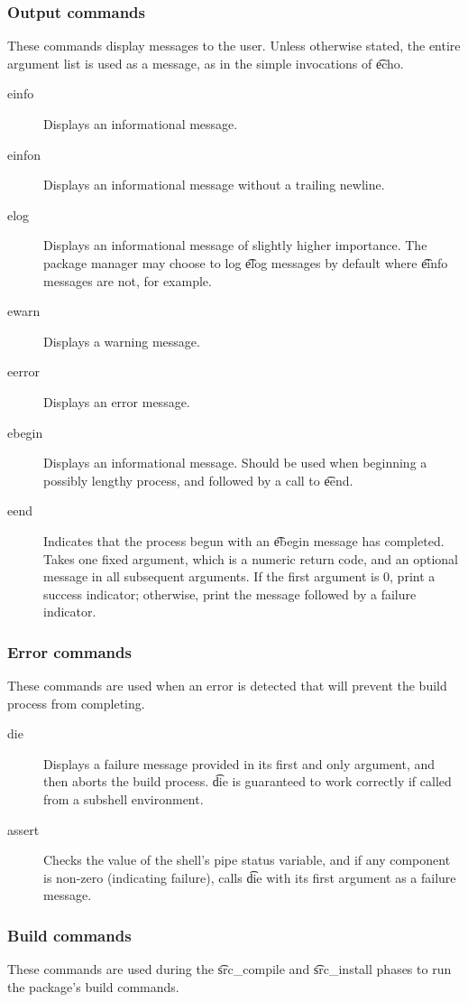 \subsubsection{Output commands}
These commands display messages to the user. Unless otherwise stated, the entire argument list is
used as a message, as in the simple invocations of \t{echo}.
\begin{description}
\item[einfo] Displays an informational message.
\item[einfon] Displays an informational message without a trailing newline.
\item[elog] Displays an informational message of slightly higher importance. The package manager may
    choose to log \t{elog} messages by default where \t{einfo} messages are not, for example.
\item[ewarn] Displays a warning message.
\item[eerror] Displays an error message.
\item[ebegin] Displays an informational message. Should be used when beginning a possibly lengthy
    process, and followed by a call to \t{eend}.
\item[eend] Indicates that the process begun with an \t{ebegin} message has completed. Takes one
    fixed argument, which is a numeric return code, and an optional message in all subsequent
    arguments. If the first argument is 0, print a success indicator; otherwise, print the message
    followed by a failure indicator.
\end{description}

\subsubsection{Error commands}
These commands are used when an error is detected that will prevent the build process from
completing.
\begin{description}
\item[die] Displays a failure message provided in its first and only argument, and then aborts the
    build process. \t{die} is  guaranteed to work correctly if called from a subshell
    environment.
\item[assert] Checks the value of the shell's pipe status variable, and if any component is non-zero
    (indicating failure), calls \t{die} with its first argument as a failure message.
\end{description}

\subsubsection{Build commands}
These commands are used during the \t{src\_compile} and \t{src\_install} phases to run the
package's build commands.

